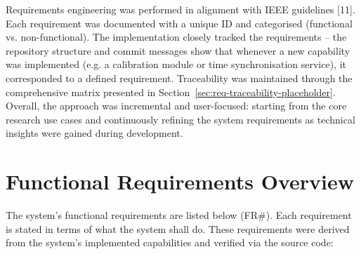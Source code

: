 Requirements engineering was performed in alignment with IEEE guidelines [11]. Each requirement was documented with a unique ID and categorised (functional vs. non-functional). The implementation closely tracked the requirements -- the repository structure and commit messages show that whenever a new capability was implemented (e.g. a calibration module or time synchronisation service), it corresponded to a defined requirement. Traceability was maintained through the comprehensive matrix presented in Section~\ref{sec:req-traceability-placeholder}. Overall, the approach was incremental and user-focused: starting from the core research use cases and continuously refining the system requirements as technical insights were gained during development.

\label{sec:req-traceability-placeholder}

\section{Functional Requirements Overview}
The system's functional requirements are listed below (FR\#). Each requirement is stated in terms of what the system shall do. These requirements were derived from the system's implemented capabilities and verified via the source code:

